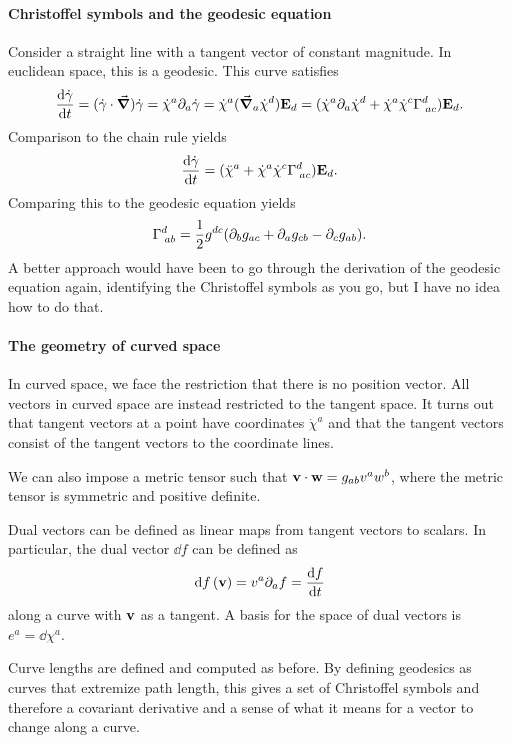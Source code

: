 \paragraph{Christoffel symbols and the geodesic equation}
Consider a straight line with a tangent vector of constant magnitude. In euclidean space, this is a geodesic. This curve satisfies
\begin{align*}
	\dv{\dot{\vb{\gamma}}}{t} = (\dot{\vb{\gamma}}\cdot\grad)\dot{\vb{\gamma}} = \dot{\chi}^{a}\partial_{a}\dot{\vb{\gamma}} = \dot{\chi}^{a}(\grad_{a}{\dot{\chi}^{d}})\vb{E}_{d} = (\dot{\chi}^{a}\partial_{a}\dot{\chi}^{d} + \dot{\chi}^{a}\dot{\chi}^{c}\Gamma^{d}_{\;ac})\vb{E}_{d}.
\end{align*}
Comparison to the chain rule yields
\begin{align*}
	\dv{\dot{\vb{\gamma}}}{t} = (\ddot{\chi}^{a} + \dot{\chi}^{a}\dot{\chi}^{c}\Gamma^{d}_{\;ac})\vb{E}_{d}.
\end{align*}
Comparing this to the geodesic equation yields
\begin{align*}
	\Gamma^{d}_{\;ab} = \frac{1}{2}g^{dc}(\partial_{b}g_{ac} + \partial_{a}g_{cb} - \partial_{c}g_{ab}).
\end{align*}
A better approach would have been to go through the derivation of the geodesic equation again, identifying the Christoffel symbols as you go, but I have no idea how to do that.

\paragraph{The geometry of curved space}
In curved space, we face the restriction that there is no position vector. All vectors in curved space are instead restricted to the tangent space. It turns out that tangent vectors at a point have coordinates $\dot{\chi}^{a}$ and that the tangent vectors consist of the tangent vectors to the coordinate lines.

We can also impose a metric tensor such that $\vb{v}\cdot\vb{w} = g_{ab}v^{a}w^{b}$, where the metric tensor is symmetric and positive definite.

Dual vectors can be defined as linear maps from tangent vectors to scalars. In particular, the dual vector $\dd{f}$ can be defined as
\begin{align*}
	\dd{f}(\vb{v}) = v^{a}\partial_{a}f = \dv{f}{t}
\end{align*}
along a curve with $\vb{v}$ as a tangent. A basis for the space of dual vectors is $e^{a} = \dd{\chi^{a}}$.

Curve lengths are defined and computed as before. By defining geodesics as curves that extremize path length, this gives a set of Christoffel symbols and therefore a covariant derivative and a sense of what it means for a vector to change along a curve.